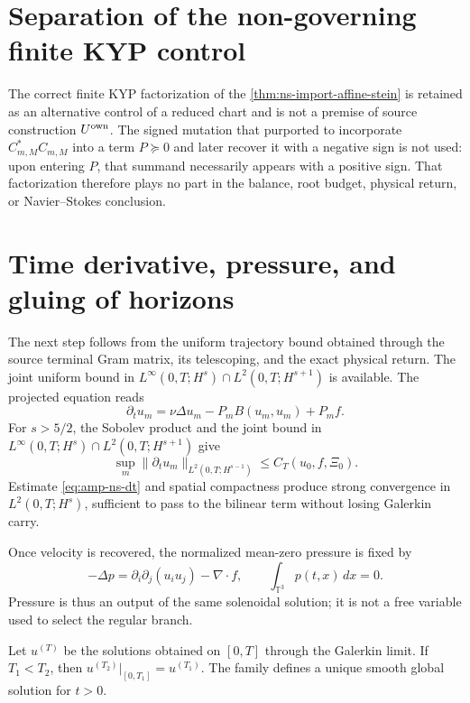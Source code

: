 \section*{Separation of the non-governing finite KYP control}

The correct finite KYP factorization of the \cref{thm:ns-import-affine-stein} is retained as an alternative control of a reduced chart and is not a premise of source construction \(U^{\rm own}\). The signed mutation that purported to incorporate \(C_{m,M}^*C_{m,M}\) into a term \(P\succeq0\) and later recover it with a negative sign is not used: upon entering \(P\), that summand necessarily appears with a positive sign. That factorization therefore plays no part in the balance, root budget, physical return, or Navier--Stokes conclusion.

\section*{Time derivative, pressure, and gluing of horizons}

The next step follows from the uniform trajectory bound obtained through the source terminal Gram matrix, its telescoping, and the exact physical return. The joint uniform bound in \(L^\infty(0,T;H^s)\cap L^2(0,T;H^{s+1})\) is available. The projected equation reads
\begin{equation}\label{eq:amp-ns-proyectada}
 \partial_tu_m
 =\nu\Delta u_m-P_mB(u_m,u_m)+P_mf.
\end{equation}
For \(s>5/2\), the Sobolev product and the joint bound in \(L^\infty(0,T;H^s)\cap L^2(0,T;H^{s+1})\) give
\begin{equation}\label{eq:amp-ns-dt}
 \sup_m\|\partial_tu_m\|_{L^2(0,T;H^{s-1})}
 \leq C_T(u_0,f,\Xi_0).
\end{equation}
Estimate \eqref{eq:amp-ns-dt} and spatial compactness produce strong convergence in \(L^2(0,T;H^s)\), sufficient to pass to the bilinear term without losing Galerkin carry.

Once velocity is recovered, the normalized mean-zero pressure is fixed by
\begin{equation}\label{eq:amp-ns-presion}
 -\Delta p
 =\partial_i\partial_j(u_i u_j)-\nabla\!\cdot f,
 \qquad \int_{\mathbb T^3}p(t,x)\,dx=0.
\end{equation}
Pressure is thus an output of the same solenoidal solution; it is not a free variable used to select the regular branch.

\begin{proposition}
\label{prop:amp-ns-pegado}
Let \(u^{(T)}\) be the solutions obtained on \([0,T]\) through the Galerkin limit. If \(T_1<T_2\), then \(u^{(T_2)}|_{[0,T_1]}=u^{(T_1)}\). The family defines a unique smooth global solution for \(t>0\).
\end{proposition}


